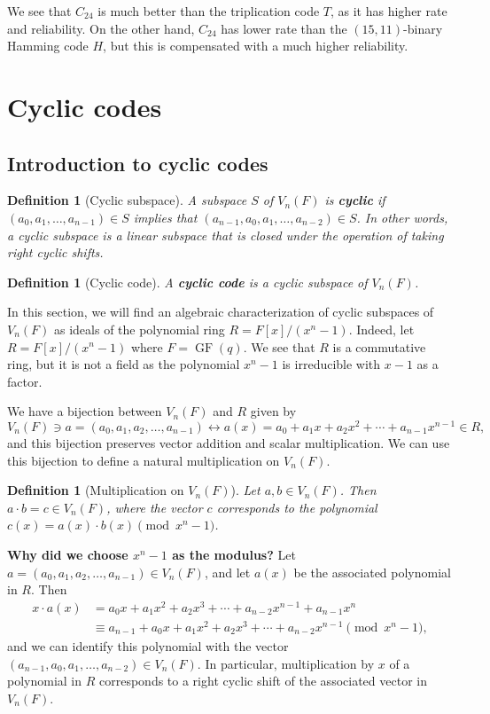 \documentclass[10pt]{article}
\DeclareMathOperator{\GF}{GF}
\theoremstyle{newstyle}
\newtheorem{defn}[thm]{Definition}
\begin{document}
We see that $C_{24}$ is much better than the triplication code $T$, as it has higher 
rate and reliability. On the other hand, $C_{24}$ has lower rate than the 
$(15, 11)$-binary Hamming code $H$, but this is compensated with a much higher reliability.

\newpage 
\section{Cyclic codes}

\subsection{Introduction to cyclic codes}

\begin{defn}[Cyclic subspace]
A subspace $S$ of $V_n(F)$ is {\bf cyclic} if $(a_0, a_1, \dots, a_{n-1}) \in S$ implies that 
$(a_{n-1}, a_0, a_1, \dots, a_{n-2}) \in S$. In other words, a cyclic subspace is a linear 
subspace that is closed under the operation of taking right cyclic shifts.
\end{defn}

\begin{defn}[Cyclic code]
A {\bf cyclic code} is a cyclic subspace of $V_n(F)$.
\end{defn}

In this section, 
we will find an algebraic characterization of cyclic subspaces of $V_n(F)$ as ideals 
of the polynomial ring $R = F[x]/(x^n-1)$. Indeed, let $R = F[x]/(x^n-1)$ where $F = 
\GF(q)$. We see that $R$ is a commutative ring, but it is not a field as the polynomial $x^n-1$ is 
irreducible with $x-1$ as a factor. 

We have a bijection between $V_n(F)$ and $R$ given by 
\[ V_n(F) \ni a = (a_0, a_1, a_2, \dots, a_{n-1}) \leftrightarrow 
a(x) = a_0 + a_1x + a_2x^2 + \cdots + a_{n-1}x^{n-1} \in R, \]
and this bijection preserves vector addition and scalar multiplication. We can use this 
bijection to define a natural multiplication on $V_n(F)$. 

\begin{defn}[Multiplication on $V_n(F)$]
Let $a, b \in V_n(F)$. Then $a \cdot b = c \in V_n(F)$, where the vector $c$ corresponds to the 
polynomial $c(x) = a(x) \cdot b(x) \pmod{x^n-1}$.
\end{defn}

{\bf Why did we choose $x^n-1$ as the modulus?} Let $a = (a_0, a_1, a_2, \dots, a_{n-1}) \in V_n(F)$, 
and let $a(x)$ be the associated polynomial in $R$. Then 
\begin{align*}
    x \cdot a(x) &= a_0x + a_1x^2 + a_2x^3 + \cdots + a_{n-2}x^{n-1} + a_{n-1} x^n \\
    &\equiv a_{n-1} + a_0x + a_1x^2 + a_2x^3 + \cdots + a_{n-2}x^{n-1} \pmod{x^n-1}, 
\end{align*}
and we can identify this polynomial with the vector $(a_{n-1}, a_0, a_1, \dots, a_{n-2}) \in V_n(F)$. 
In particular, multiplication by $x$ of a polynomial in $R$ corresponds to a right 
cyclic shift of the associated vector in $V_n(F)$. 
\end{document}
